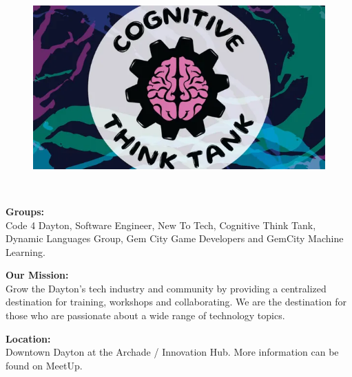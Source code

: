 \documentclass[
  letterpaper,
  DIV=11,
  numbers=noendperiod]{scrartcl}
\begin{document}
\begin{figure}
\begin{minipage}[b]{0.30\linewidth}
{}

\end{minipage}%
%
\begin{minipage}[b]{0.02\linewidth}

{\centering 

~

}

\end{minipage}%
%
\begin{minipage}[b]{0.28\linewidth}

{\centering 

\includegraphics{../img/CognitiveThinkTank.png}

}

\end{minipage}%
%
\begin{minipage}[b]{0.05\linewidth}

{\centering 

~

}

\end{minipage}%

\end{figure}

\vspace{-.5\baselineskip}

\textbf{\large Groups:}\\
Code 4 Dayton, Software Engineer, New To Tech, Cognitive Think Tank,
Dynamic Languages Group, Gem City Game Developers and GemCity Machine
Learning.

\textbf{\large Our Mission:}\\
Grow the Dayton's tech industry and community by providing a centralized
destination for training, workshops and collaborating. We are the
destination for those who are passionate about a wide range of
technology topics.

\textbf{\large Location:}\\
Downtown Dayton at the Archade / Innovation Hub. More information can be
found on MeetUp.
\end{document}
